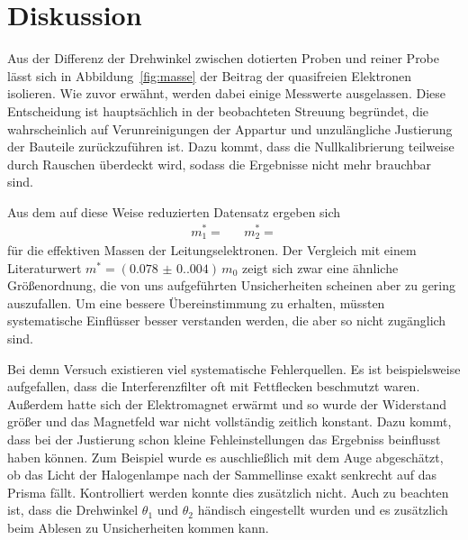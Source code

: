 \section{Diskussion}
\label{sec:diskussion}

Aus der Differenz der Drehwinkel zwischen dotierten Proben und reiner Probe lässt sich in Abbildung~\ref{fig:masse} der
Beitrag der quasifreien Elektronen isolieren. Wie zuvor erwähnt, werden dabei einige Messwerte ausgelassen. Diese Entscheidung ist
hauptsächlich in der beobachteten Streuung begründet, die wahrscheinlich auf Verunreinigungen der Appartur und unzulängliche
Justierung der Bauteile zurückzuführen ist. Dazu kommt, dass die Nullkalibrierung teilweise durch Rauschen überdeckt wird,
sodass die Ergebnisse nicht mehr brauchbar sind. 

Aus dem auf diese Weise reduzierten Datensatz ergeben sich
\begin{align*}
    m^{*}_1 =  && m^{*}_2 = 
\end{align*}
für die effektiven Massen der Leitungselektronen. Der Vergleich mit einem Literaturwert $m^{*} = (\num{0.078(0.004)})\,m_0$
\cite{PhysRev.114.59} zeigt sich zwar eine ähnliche Größenordnung, die von uns aufgeführten Unsicherheiten scheinen aber
zu gering auszufallen. Um eine bessere Übereinstimmung zu erhalten, müssten systematische Einflüsser besser verstanden werden, die
aber so nicht zugänglich sind.


Bei demn Versuch existieren viel systematische Fehlerquellen. Es ist beispielsweise aufgefallen, dass die Interferenzfilter oft 
mit Fettflecken beschmutzt waren. 
Außerdem hatte sich der Elektromagnet erwärmt und so wurde der Widerstand größer und das Magnetfeld war nicht vollständig zeitlich
konstant.
Dazu kommt, dass bei der Justierung schon kleine Fehleinstellungen das Ergebniss 
beinflusst haben können. Zum Beispiel wurde es auschließlich mit dem Auge abgeschätzt, ob das Licht der Halogenlampe nach der
Sammellinse exakt senkrecht auf das Prisma fällt.  Kontrolliert werden konnte dies zusätzlich nicht.
Auch zu beachten ist, dass die Drehwinkel $\theta_1$ und $\theta_2$ händisch eingestellt wurden und es zusätzlich
beim Ablesen zu Unsicherheiten kommen kann.
